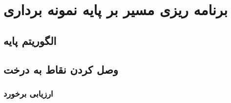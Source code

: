 \section{برنامه ریزی مسیر بر پایه نمونه برداری}
\subsection{الگوریتم پایه}
\subsection{وصل کردن نقاط به درخت}
\subsubsection{ارزیابی برخورد}
